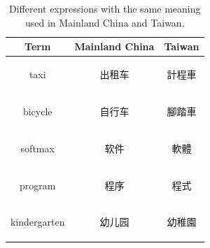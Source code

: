 \documentclass[11pt,a4paper]{article}
\begin{document}
\begin{table}[t!]
\begin{center}
\begin{tabular}{ccc}
\hline \bf Term & \bf Mainland China & \bf Taiwan \\ \hline
taxi & \begin{CJK}{UTF8}{gbsn}出租车\end{CJK}  &  \begin{CJK}{UTF8}{bsmi}計程車\end{CJK} \\
bicycle &   \begin{CJK}{UTF8}{gbsn}自行车\end{CJK} & \begin{CJK}{UTF8}{bsmi}腳踏車\end{CJK} \\
softmax & \begin{CJK}{UTF8}{gbsn}软件\end{CJK} &  \begin{CJK}{UTF8}{bsmi}軟體\end{CJK}  \\
program &  \begin{CJK}{UTF8}{gbsn}程序\end{CJK} & \begin{CJK}{UTF8}{bsmi}程式\end{CJK} \\
kindergarten &  \begin{CJK}{UTF8}{gbsn}幼儿园\end{CJK} & \begin{CJK}{UTF8}{bsmi}幼稚園\end{CJK} \\
\hline
\end{tabular}
\end{center}
\caption{\label{vocab differ} Different expressions with the same meaning used in Mainland China and Taiwan. }
\end{table}
\end{document}
